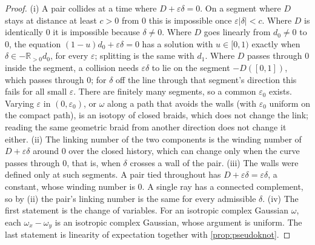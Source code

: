 \documentclass[11pt]{article}
\theoremstyle{definition}\newtheorem{definition}[theorem]{Definition}\newtheorem{remark}[theorem]{Remark}\newtheorem{example}[theorem]{Example}\newtheorem{problem}[theorem]{Open problem}\crefname{problem}{Problem}{Problems}
\begin{document}
\begin{proof}
(i) A pair collides at a time where $D+\varepsilon\delta=0$. On a segment where $D$ stays at distance at least $c>0$ from $0$ this is impossible once $\varepsilon|\delta|<c$. Where $D$ is identically $0$ it is impossible because $\delta\ne0$. Where $D$ goes linearly from $d_0\ne0$ to $0$, the equation $(1-u)d_0+\varepsilon\delta=0$ has a solution with $u\in[0,1)$ exactly when $\delta\in-\mathbb R_{>0}d_0$, for every $\varepsilon$; splitting is the same with $d_1$. Where $D$ passes through $0$ inside the segment, a collision needs $\varepsilon\delta$ to lie on the segment $-D([0,1])$, which passes through $0$; for $\delta$ off the line through that segment's direction this fails for all small $\varepsilon$. There are finitely many segments, so a common $\varepsilon_0$ exists. Varying $\varepsilon$ in $(0,\varepsilon_0)$, or $\omega$ along a path that avoids the walls (with $\varepsilon_0$ uniform on the compact path), is an isotopy of closed braids, which does not change the link; reading the same geometric braid from another direction does not change it either. (ii) The linking number of the two components is the winding number of $D+\varepsilon\delta$ around $0$ over the closed history, which can change only when the curve passes through $0$, that is, when $\delta$ crosses a wall of the pair. (iii) The walls were defined only at such segments. A pair tied throughout has $D+\varepsilon\delta=\varepsilon\delta$, a constant, whose winding number is $0$. A single ray has a connected complement, so by (ii) the pair's linking number is the same for every admissible $\delta$. (iv) The first statement is the change of variables. For an isotropic complex Gaussian $\omega$, each $\omega_x-\omega_y$ is an isotropic complex Gaussian, whose argument is uniform. The last statement is linearity of expectation together with \cref{prop:pseudoknot}.
\end{proof}
\end{document}
